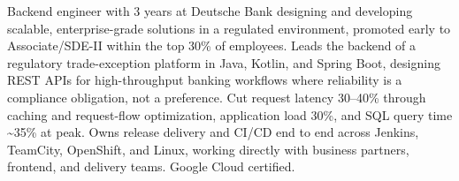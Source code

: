 \documentclass[11pt,a4paper,sans]{moderncv}
\begin{document}
\makecvtitle


\vspace{6pt}
\small{Backend engineer with 3 years at Deutsche Bank designing and developing scalable, enterprise-grade solutions in a regulated environment, promoted early to Associate/SDE-II within the top 30\% of employees. Leads the backend of a regulatory trade-exception platform in Java, Kotlin, and Spring Boot, designing REST APIs for high-throughput banking workflows where reliability is a compliance obligation, not a preference. Cut request latency 30--40\% through caching and request-flow optimization, application load 30\%, and SQL query time \textasciitilde35\% at peak. Owns release delivery and CI/CD end to end across Jenkins, TeamCity, OpenShift, and Linux, working directly with business partners, frontend, and delivery teams. Google Cloud certified.}

\end{document}
